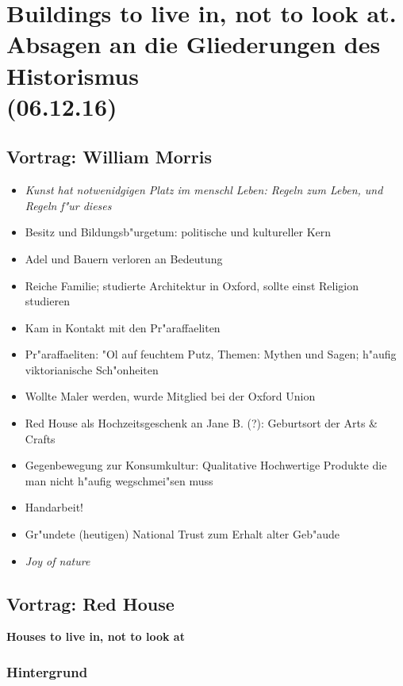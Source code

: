 \documentclass[a5paper]{scrartcl}
\begin{document}
\section{Buildings to live in, not to look at. Absagen an die Gliederungen des Historismus\\(06.12.16)}


\subsection{Vortrag: William Morris}

\begin{itemize}
  \item \emph{Kunst hat notwenidgigen Platz im menschl Leben: Regeln zum Leben, und Regeln f"ur dieses}
  \item Besitz und Bildungsb"urgetum: politische und kultureller Kern
  \item Adel und Bauern verloren an Bedeutung
  \item Reiche Familie; studierte Architektur in Oxford, sollte einst Religion studieren
  \item Kam in Kontakt mit den Pr"araffaeliten
  \item Pr"araffaeliten: "Ol auf feuchtem Putz, Themen: Mythen und Sagen; h"aufig viktorianische Sch"onheiten
  \item Wollte Maler werden, wurde Mitglied bei der Oxford Union
  \item Red House als Hochzeitsgeschenk an Jane B. (?): Geburtsort der Arts \& Crafts
  \item Gegenbewegung zur Konsumkultur: Qualitative Hochwertige Produkte die man nicht h"aufig wegschmei"sen muss
  \item Handarbeit!
  \item Gr"undete (heutigen) National Trust zum Erhalt alter Geb"aude
  \item \emph{Joy of nature}
\end{itemize}


\subsection{Vortrag: Red House}

\textbf{Houses to live in, not to look at}

\subsubsection{Hintergrund}
\end{document}
